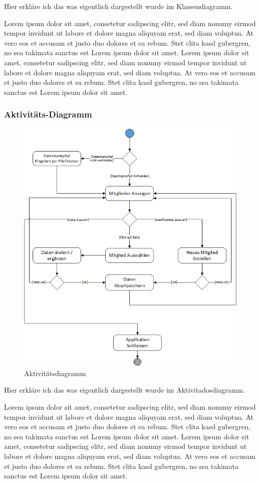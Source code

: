 \documentclass{article}
\begin{document}
Hier erkläre ich das was eigentlich dargestellt wurde im Klassendiagramm.

Lorem ipsum dolor sit amet, consetetur sadipscing elitr, sed diam nonumy eirmod tempor invidunt ut labore et dolore magna aliquyam erat, sed diam voluptua. At vero eos et accusam et justo duo dolores et ea rebum. Stet clita kasd gubergren, no sea takimata sanctus est Lorem ipsum dolor sit amet. Lorem ipsum dolor sit amet, consetetur sadipscing elitr, sed diam nonumy eirmod tempor invidunt ut labore et dolore magna aliquyam erat, sed diam voluptua. At vero eos et accusam et justo duo dolores et ea rebum. Stet clita kasd gubergren, no sea takimata sanctus est Lorem ipsum dolor sit amet.
\newpage

\subsubsection{Aktivitäts-Diagramm}
\begin{figure}[h]
	\centering
	\includegraphics[width=0.8 \textwidth]{Aktivtaetsdiagramm}
	\caption{Aktivitätsdiagramm}
\end{figure}

Hier erkläre ich das was eigentlich dargestellt wurde im Aktivitadosdiagramm.

Lorem ipsum dolor sit amet, consetetur sadipscing elitr, sed diam nonumy eirmod tempor invidunt ut labore et dolore magna aliquyam erat, sed diam voluptua. At vero eos et accusam et justo duo dolores et ea rebum. Stet clita kasd gubergren, no sea takimata sanctus est Lorem ipsum dolor sit amet. Lorem ipsum dolor sit amet, consetetur sadipscing elitr, sed diam nonumy eirmod tempor invidunt ut labore et dolore magna aliquyam erat, sed diam voluptua. At vero eos et accusam et justo duo dolores et ea rebum. Stet clita kasd gubergren, no sea takimata sanctus est Lorem ipsum dolor sit amet.
\end{document}
